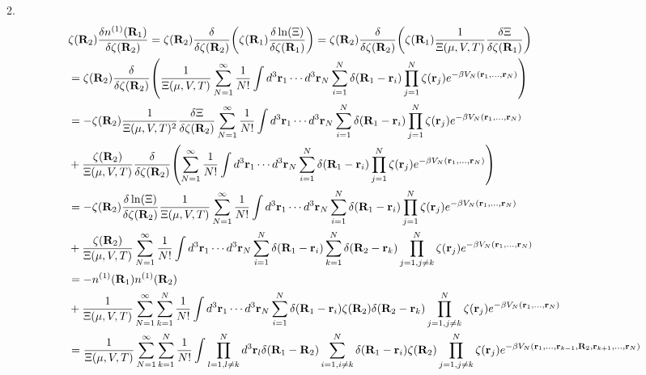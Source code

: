 \documentclass{article}
\begin{document}
2.
\begin{align}
\begin{split}
&\zeta(\vb{R}_2)\frac{\delta n^{(1)}(\vb{R}_1)}{\delta\zeta(\vb{R}_2)}=\zeta(\vb{R}_2)\frac{\delta}{\delta\zeta(\vb{R}_2)}\qty(\zeta(\vb{R}_1)\frac{\delta\ln(\Xi)}{\delta\zeta(\vb{R}_1)})=\zeta(\vb{R}_2)\frac{\delta}{\delta\zeta(\vb{R}_2)}\qty(\zeta(\vb{R}_1)\frac{1}{\Xi(\mu,V,T)}\frac{\delta\Xi}{\delta\zeta(\vb{R}_1)})\\
&=\zeta(\vb{R}_2)\frac{\delta}{\delta\zeta(\vb{R}_2)}\qty(\frac{1}{\Xi(\mu,V,T)}\sum_{N=1}^\infty \frac{1}{N!}\int d^3\vb{r}_1\cdots d^3\vb{r}_N\sum_{i=1}^N\delta(\vb{R}_1-\vb{r}_i)\prod_{j=1}^N\zeta(\vb{r}_j)e^{-\beta V_N(\vb{r}_1,\dots,\vb{r}_N)})\\
&=-\zeta(\vb{R}_2)\frac{1}{\Xi(\mu,V,T)^2}\frac{\delta\Xi}{\delta\zeta(\vb{R}_2)}\sum_{N=1}^\infty \frac{1}{N!}\int d^3\vb{r}_1\cdots d^3\vb{r}_N\sum_{i=1}^N\delta(\vb{R}_1-\vb{r}_i)\prod_{j=1}^N\zeta(\vb{r}_j)e^{-\beta V_N(\vb{r}_1,\dots,\vb{r}_N)}\\
&+\frac{\zeta(\vb{R}_2)}{\Xi(\mu,V,T)}\frac{\delta}{\delta\zeta(\vb{R}_2)}\qty(\sum_{N=1}^\infty \frac{1}{N!}\int d^3\vb{r}_1\cdots d^3\vb{r}_N\sum_{i=1}^N\delta(\vb{R}_1-\vb{r}_i)\prod_{j=1}^N\zeta(\vb{r}_j)e^{-\beta V_N(\vb{r}_1,\dots,\vb{r}_N)})\\
&=-\zeta(\vb{R}_2)\frac{\delta\ln(\Xi)}{\delta\zeta(\vb{R}_2)}\frac{1}{\Xi(\mu,V,T)}\sum_{N=1}^\infty \frac{1}{N!}\int d^3\vb{r}_1\cdots d^3\vb{r}_N\sum_{i=1}^N\delta(\vb{R}_1-\vb{r}_i)\prod_{j=1}^N\zeta(\vb{r}_j)e^{-\beta V_N(\vb{r}_1,\dots,\vb{r}_N)}\\
&+\frac{\zeta(\vb{R}_2)}{\Xi(\mu,V,T)}\sum_{N=1}^\infty \frac{1}{N!}\int d^3\vb{r}_1\cdots d^3\vb{r}_N\sum_{i=1}^N\delta(\vb{R}_1-\vb{r}_i)\sum_{k=1}^N\delta(\vb{R}_2-\vb{r}_k)\prod_{j=1,j\neq k}^N\zeta(\vb{r}_j)e^{-\beta V_N(\vb{r}_1,\dots,\vb{r}_N)}\\
&=-n^{(1)}(\vb{R}_1)n^{(1)}(\vb{R}_2)\\
&+\frac{1}{\Xi(\mu,V,T)}\sum_{N=1}^\infty\sum_{k=1}^N \frac{1}{N!}\int d^3\vb{r}_1\cdots d^3\vb{r}_N\sum_{i=1}^N\delta(\vb{R}_1-\vb{r}_i)\zeta(\vb{R}_2)\delta(\vb{R}_2-\vb{r}_k)\prod_{j=1,j\neq k}^N\zeta(\vb{r}_j)e^{-\beta V_N(\vb{r}_1,\dots,\vb{r}_N)}\\
&=\frac{1}{\Xi(\mu,V,T)}\sum_{N=1}^\infty\sum_{k=1}^N \frac{1}{N!}\int \prod_{l=1,l\neq k}^Nd^3\vb{r}_l\delta(\vb{R}_1-\vb{R}_2)\sum_{i=1,i\neq k}^N\delta(\vb{R}_1-\vb{r}_i)\zeta(\vb{R}_2)\prod_{j=1,j\neq k}^N\zeta(\vb{r}_j)e^{-\beta V_N(\vb{r}_1,\dots,\vb{r}_{k-1},\vb{R}_2,\vb{r}_{k+1},\dots,\vb{r}_N)}\\

\end{split}
\end{align}
\end{document}
